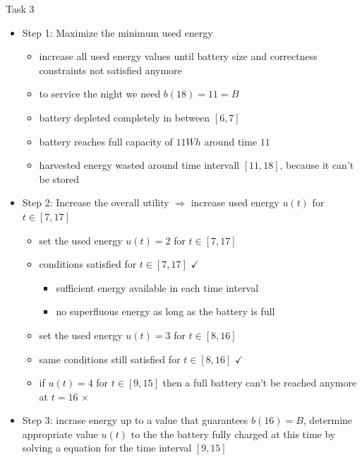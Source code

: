 \begin{frame}[allowframebreaks]{Task 3}{}
  \begin{solutionnoinc}
    \begin{itemize}
      \item \alert{Step 1:} Maximize the minimum used energy
      \begin{itemize}
        \item increase all used energy values until battery size and correctness constraints not satisfied anymore
        \item to service the night we need $b(18)=11=B$
        \item battery depleted completely in between $[6, 7]$
        \item battery reaches full capacity of $11Wh$ around time $11$
        \item harvested energy wasted around time intervall $[11, 18]$, because it can't be stored
      \end{itemize}
    \item \alert{Step 2:} Increase the overall utility $\Rightarrow$ increase used energy $u(t)$ for $t\in [7, 17]$
        \begin{itemize}
          \item set the used energy $u(t) = 2$ for $t\in[7, 17]$
          \item conditions satisfied for $t\in [7, 17]$ $\checkmark$
            \begin{itemize}
              \item sufficient energy available in each time interval
              \item no superfluous energy as long as the battery is full
            \end{itemize}
          \item set the used energy $u(t) = 3$ for $t\in[8, 16]$
          \item same conditions still satisfied for $t\in [8, 16]$ $\checkmark$
          \item if $u(t)=4$ for $t\in[9, 15]$ then a full battery can't be reached anymore at $t=16$  $\times$
        \end{itemize}
      \end{itemize}
  \end{solutionnoinc}
  \begin{solutionnoinc}
    \begin{itemize}
      \item \alert{Step 3:} incrase energy up to a value that guarantees $b(16)=B$, determine appropriate value $u(t)$ to the the battery fully charged at this time by solving a equation for the time interval $[9, 15]$

\end{itemize}
\end{solutionnoinc}
\end{frame}
